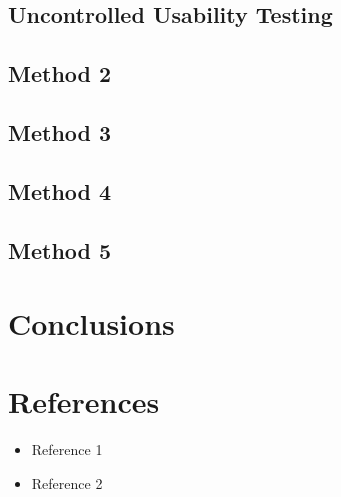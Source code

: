 \documentclass{report}
\begin{document}
\section{Uncontrolled Usability Testing}
\section{Method 2}
\section{Method 3}
\section{Method 4}
\section{Method 5}

\chapter{Conclusions}

\newpage
{}
\chapter*{References}
\begin{itemize}
    \item Reference 1
    \item Reference 2
\end{itemize}

\newpage
{}
\listoffigures
\end{document}
